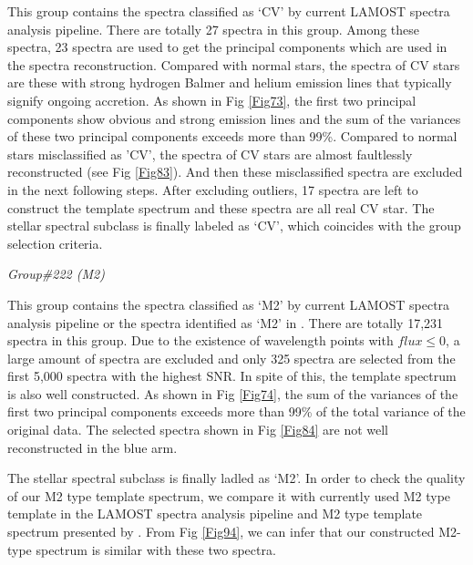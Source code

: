 \documentclass[manuscript]{aastex}
\begin{document}
This group contains the spectra classified as `CV' by current LAMOST spectra analysis pipeline.
There are totally 27 spectra in this group.
Among these spectra, 23 spectra are used to get the principal components which are used in the spectra reconstruction.
Compared with normal stars, the spectra of CV stars are these with strong hydrogen Balmer and helium emission lines that typically signify ongoing accretion.
As shown in Fig \ref{Fig73}, the first two principal components show obvious and strong emission lines and the sum of the variances of these two  principal components  exceeds more than 99\%.
Compared to normal stars misclassified as 'CV', the spectra of CV stars are almost faultlessly reconstructed (see Fig \ref{Fig83}).
And then these misclassified spectra are excluded in the next following steps.
After excluding outliers, 17 spectra are left to construct the template spectrum and these spectra are all real CV star.
The stellar spectral subclass is finally labeled as `CV',
which coincides with the group selection criteria.



\emph{Group\#222 (M2)} 

This group contains the spectra classified as `M2' by current LAMOST spectra analysis pipeline or the spectra identified as `M2' in \cite{yi2013m}.
There are totally 17,231 spectra in this group.
Due to the existence of wavelength points with $flux\le0$, a large amount of  spectra are excluded and only 325 spectra are selected from the first 5,000 spectra with the highest SNR.
In spite of this, the template spectrum is also well constructed.
As shown in Fig \ref{Fig74}, the sum of the variances of the first two principal components  exceeds more than 99\% of the total variance of the original data.
The selected spectra shown in Fig \ref{Fig84} are not well reconstructed in the blue arm.



The stellar spectral subclass is finally ladled as `M2'.
In order to check the quality of our M2 type template spectrum,
we compare it with currently used M2 type template in the LAMOST spectra analysis pipeline and
M2 type template spectrum presented by \citet{bochanski2007low}.
From Fig \ref{Fig94}, we can infer that our constructed M2-type spectrum is similar with these two spectra.




%
%
%
\end{document}
